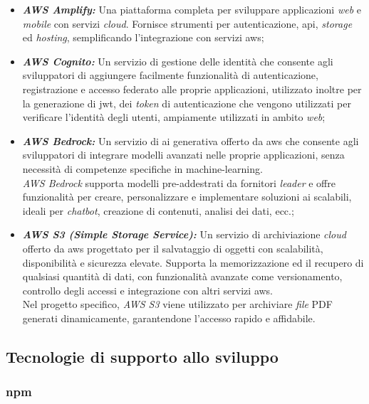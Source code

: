 \begin{itemize}
\item \textbf{\textit{AWS Amplify:}} Una piattaforma completa per sviluppare applicazioni \textit{web} e \textit{mobile} con servizi \textit{cloud}. 
Fornisce strumenti per autenticazione, \gls{api}, \textit{storage} ed \textit{hosting}, semplificando l'integrazione con servizi \gls{aws};
\item \textbf{\textit{AWS Cognito:}} Un servizio di gestione delle identità che consente agli sviluppatori di aggiungere facilmente funzionalità di autenticazione, registrazione e accesso federato alle proprie applicazioni,
utilizzato inoltre per la generazione di \gls{jwt}, dei \textit{token} di autenticazione che vengono utilizzati per verificare l'identità degli utenti, ampiamente utilizzati in ambito \textit{web};
\item \textbf{\textit{AWS Bedrock:}} Un servizio di \gls{ai} generativa offerto da \gls{aws} che consente agli sviluppatori di integrare modelli avanzati nelle proprie applicazioni, senza necessità di competenze specifiche in \gls{machine-learning}.\\ 
\textit{AWS Bedrock} supporta modelli pre-addestrati da fornitori \textit{leader} e offre funzionalità per creare, personalizzare e implementare soluzioni \gls{ai} scalabili, ideali per \textit{chatbot}, creazione di contenuti, analisi dei dati, ecc.;
\item \textbf{\textit{AWS S3 (Simple Storage Service):}} Un servizio di archiviazione \textit{cloud} offerto da \gls{aws} progettato per il salvataggio di oggetti con scalabilità, disponibilità e sicurezza elevate.
Supporta la memorizzazione ed il recupero di qualsiasi quantità di dati, con funzionalità avanzate come versionamento, controllo degli accessi e integrazione con altri servizi \gls{aws}. \\
Nel progetto specifico, \textit{AWS S3} viene utilizzato per archiviare \textit{file} PDF generati dinamicamente, garantendone l'accesso rapido e affidabile.
\end{itemize}

\pagebreak
\subsection{Tecnologie di supporto allo sviluppo}
\label{sez:tecnologie-supporto-sviluppo}

\subsubsection{\gls{npm}}

